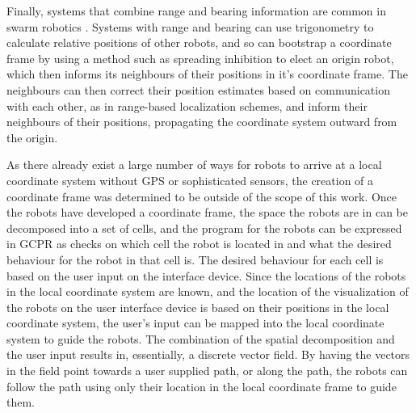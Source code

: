 Finally, systems that combine range and bearing information are common in swarm robotics \citep{arvin2009development, farrow2014miniature, caprari1998autonomous, mondada2009puck}. 
Systems with range and bearing can use trigonometry to calculate relative positions of other robots, and so can bootstrap a coordinate frame by using a method such as spreading inhibition to elect an origin robot, which then informs its neighbours of their positions in it's coordinate frame. The neighbours can then correct their position estimates based on communication with each other, as in range-based localization schemes, and inform their neighbours of their positions, propagating the coordinate system outward from the origin. 

As there already exist a large number of ways for robots to arrive at a local coordinate system without GPS or sophisticated sensors, the creation of a coordinate frame was determined to be outside of the scope of this work. 
Once the robots have developed a coordinate frame, the space the robots are in can be decomposed into a set of cells, and the program for the robots can be expressed in GCPR as checks on which cell the robot is located in and what the desired behaviour for the robot in that cell is. 
The desired behaviour for each cell is based on the user input on the interface device. Since the locations of the robots in the local coordinate system are known, and the location of the visualization of the robots on the user interface device is based on their positions in the local coordinate system, the user's input can be mapped into the local coordinate system to guide the robots. 
The combination of the spatial decomposition and the user input results in, essentially, a discrete vector field. 
By having the vectors in the field point towards a user supplied path, or along the path, the robots can follow the path using only their location in the local coordinate frame to guide them. 


